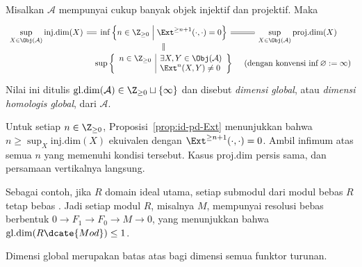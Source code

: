 \begin{definisi-proposisi}\label{def:global-dim}
	Misalkan $\mathcal{A}$ mempunyai cukup banyak objek injektif dan projektif.
	Maka
	\[\begin{tikzcd}[row sep=tiny, column sep=tiny, ampersand replacement=\&]
		\displaystyle\sup_{X \in \Obj(\mathcal{A})} \mathrm{inj.dim}(X) \arrow[equal, r] \& \inf \left\{ n \in \Z_{\geq 0} \;\middle| \; \Ext^{\geq n+1}(\cdot, \cdot) = 0 \right\} \arrow[equal, r] \& \displaystyle\sup_{X \in \Obj(\mathcal{A})} \mathrm{proj.dim}(X) \\
		\& \sup\left\{{\begin{array}{r|l}
			 n \in \Z_{\geq 0} & \exists X, Y \in \Obj(\mathcal{A}) \\
			 & \Ext^n(X,Y) \neq 0
		\end{array}}\right\} \arrow[equal, u] \& \text{(dengan konvensi $\inf \emptyset := \infty$)}
	\end{tikzcd}\]
	Nilai ini ditulis
	$\mathrm{gl.dim}(\mathcal{A})\in\Z_{\geq0}\sqcup\{\infty\}$ dan disebut
	\emph{dimensi global}, atau \emph{dimensi homologis global}, dari
	$\mathcal{A}$.
\end{definisi-proposisi}
\begin{bukti}
	Untuk setiap $n\in\Z_{\geq0}$, Proposisi~\ref{prop:id-pd-Ext} menunjukkan
	bahwa $n\geq\sup_X\mathrm{inj.dim}(X)$ ekuivalen dengan
	$\Ext^{\geq n+1}(\cdot,\cdot)=0$. Ambil infimum atas semua $n$ yang
	memenuhi kondisi tersebut. Kasus $\mathrm{proj.dim}$ persis sama, dan
	persamaan vertikalnya langsung.
\end{bukti}

Sebagai contoh, jika $R$ domain ideal utama, setiap submodul dari modul bebas
$R$ tetap bebas \cite[Lema 6.7.4]{Li1}. Jadi setiap modul $R$, misalnya
$M$, mempunyai resolusi bebas berbentuk
$0\to F_1\to F_0\to M\to0$, yang menunjukkan bahwa
$\mathrm{gl.dim}(R\dcate{Mod})\leq1$.

Dimensi global merupakan batas atas bagi dimensi semua funktor turunan.

